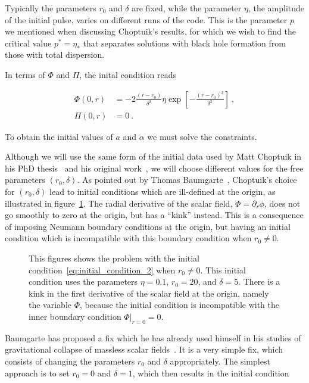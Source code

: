 \documentclass[a4paper,11pt]{article}
\renewcommand{\a}{\alpha}
\renewcommand{\d}{\delta}
\newcommand{\pd}{\partial}
\newcommand{\lrpar}[1]{\left( #1 \right)}
\newcommand{\lrsquare}[1]{\left[ #1 \right]}
\newcommand{\n}{\noindent}
\newcommand{\eq}[1]{
  \begin{equation}
    #1
  \end{equation}
}
\newcommand{\spl}[1]{
  \begin{split}
    #1
  \end{split}
}
\begin{document}
\n Typically the parameters $r_{0}$ and $\d$ are fixed, while the parameter $\eta$, the amplitude of the initial pulse, varies on different runs of the code. This is the parameter $p$ we mentioned when discussing Choptuik's results, for which we wish to find the critical value $p^{*}=\eta_{*}$ that separates solutions with black hole formation from those with total dispersion.

In terms of $\Phi$ and $\Pi$, the inital condition reads

\eq{
  \spl{
    \Phi(0,r) &= -2\frac{\lrpar{r-r_{0}}}{\d^{2}}\eta\exp\lrsquare{-\frac{\lrpar{r-r_{0}}^{2}}{\d^{2}}}\ ,\\
    \Pi(0,r)  &= 0\ .
  }
  \label{eq:initial_condition_2}
}

\n To obtain the initial values of $a$ and $\a$ we must solve the constraints.

Although we will use the same form of the initial data used by Matt Choptuik in his PhD thesis~\cite{Choptuik_1986} and his original work~\cite{PhysRevLett.70.9}, we will choose different values for the free parameters $\lrpar{r_{0},\d}$. As pointed out by Thomas Baumgarte~\cite{Baumgarte_private}, Choptuik's choice for $\lrpar{r_{0},\d}$ lead to initial conditions which are ill-defined at the origin, as illustrated in figure~\ref{fig:origin_problem}. The radial derivative of the scalar field, $\Phi=\pd_{r}\phi$, does not go smoothly to zero at the origin, but has a ``kink'' instead. This is a consequence of imposing Neumann boundary conditions at the origin, but having an initial condition which is incompatible with this boundary condition when $r_{0}\neq 0$.

\begin{figure}[H]
  \centering
  
  \caption[Problem with the initial condition at the origin.]{This figures shows the problem with the initial condition~\eqref{eq:initial_condition_2} when $r_{0}\neq0$. This initial condition uses the parameters $\eta=0.1$, $r_{0}=20$, and $\d=5$. There is a kink in the first derivative of the scalar field at the origin, namely the variable $\Phi$, because the initial condition is incompatible with the inner boundary condition $\left.\Phi\right|_{r=0}=0$.}
  \label{fig:origin_problem}
\end{figure}

Baumgarte has proposed a fix which he has already used himself in his studies of gravitational collapse of massless scalar fields~\cite{Baumgarte_2018}. It is a very simple fix, which consists of changing the parameters $r_{0}$ and $\delta$ appropriately. The simplest approach is to set $r_{0}=0$ and $\d=1$, which then results in the initial condition
\end{document}
